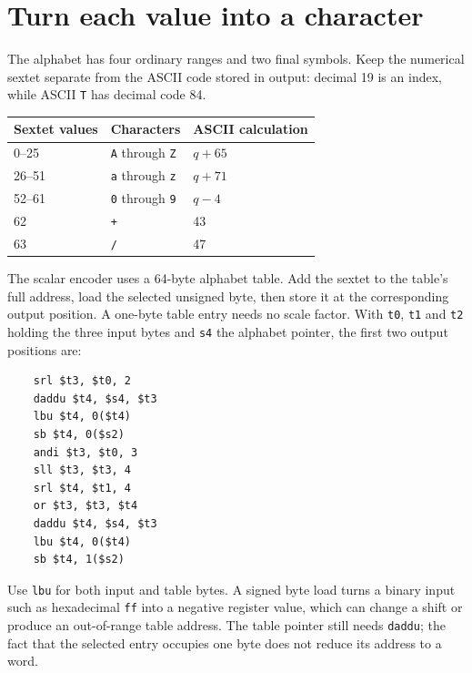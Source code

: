 \section{Turn each value into a character}
The alphabet has four ordinary ranges and two final symbols. Keep the numerical
sextet separate from the ASCII code stored in output: decimal 19 is an index, while
ASCII \texttt{T} has decimal code 84.
\begin{center}
  \begin{tabular}{lll}
    Sextet values & Characters                    & ASCII calculation \\
    \hline
    0--25         & \texttt{A} through \texttt{Z} & \(q+65\)          \\
    26--51        & \texttt{a} through \texttt{z} & \(q+71\)          \\
    52--61        & \texttt{0} through \texttt{9} & \(q-4\)           \\
    62            & \texttt{+}                    & 43                \\
    63            & \texttt{/}                    & 47                \\
  \end{tabular}
\end{center}

The scalar encoder uses a 64-byte alphabet table. Add the sextet to the table's full
address, load the selected unsigned byte, then store it at the corresponding output
position. A one-byte table entry needs no scale factor. With \texttt{t0}, \texttt{t1}
and \texttt{t2} holding the three input bytes and \texttt{s4} the alphabet pointer,
the first two output positions are:

\begin{verbatim}
    srl $t3, $t0, 2
    daddu $t4, $s4, $t3
    lbu $t4, 0($t4)
    sb $t4, 0($s2)
    andi $t3, $t0, 3
    sll $t3, $t3, 4
    srl $t4, $t1, 4
    or $t3, $t3, $t4
    daddu $t4, $s4, $t3
    lbu $t4, 0($t4)
    sb $t4, 1($s2)
\end{verbatim}

Use \texttt{lbu} for both input and table bytes. A signed byte load turns a binary
input such as hexadecimal \texttt{ff} into a negative register value, which can change
a shift or produce an out-of-range table address. The table pointer still needs
\texttt{daddu}; the fact that the selected entry occupies one byte does not reduce its
address to a word.
